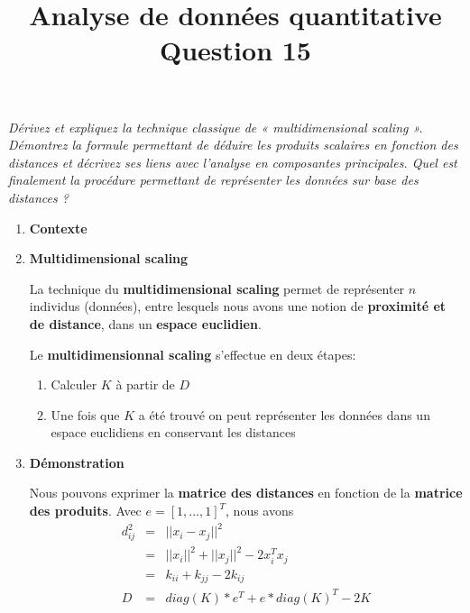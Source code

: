 \documentclass[a4paper, 11pt, onecolumn]{article}
\title{Analyse de données quantitative\\Question 15}
\date{}
\begin{document}
\maketitle

\textit{Dérivez et expliquez la technique classique de « multidimensional scaling ». Démontrez la formule permettant de déduire les produits scalaires en fonction des distances et décrivez ses liens avec l’analyse en composantes principales. Quel est finalement la procédure permettant
de représenter les données sur base des distances ?}

\begin{enumerate}

\item \textbf{Contexte}

\item \textbf{Multidimensional scaling}

  La technique du \textbf{multidimensional scaling} permet de représenter $n$ individus (données), entre lesquels nous avons une notion de \textbf{proximité et de distance}, dans un \textbf{espace euclidien}.


  Le \textbf{multidimensionnal scaling} s'effectue en deux étapes:
\begin{enumerate}
\item Calculer $K$ à partir de $D$
\item Une fois que $K$ a été trouvé on peut représenter les données dans un espace euclidiens en conservant les distances
\end{enumerate}

\item \textbf{Démonstration}

  Nous pouvons exprimer la \textbf{matrice des distances} en fonction de la 
  \textbf{matrice des produits}. Avec $e = [1,...,1]^T$, nous avons
\begin{eqnarray}
d^2_{ij}&=&||x_i-x_j||^2\\
&=& ||x_i||^2 + ||x_j||^2 - 2x_i^Tx_j\\
&=&k_{ii}+k_{jj}-2k_{ij}\\
D &=& diag(K)*e^T + e*diag(K)^T-2K
\end{eqnarray}


\end{enumerate}
\end{document}
